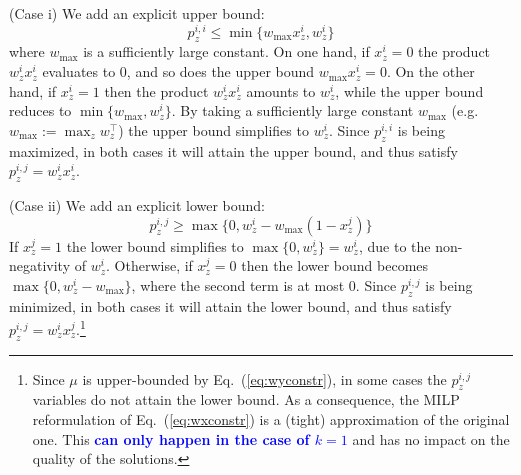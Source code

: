 \documentclass{article}
\renewcommand\[{\begin{equation}}
\renewcommand\]{\end{equation}}
\newcommand{\andrea}[1]{{\bf \textcolor{blue}{{\fbox{Andrea:} #1}}}}
\begin{document}
(Case i) We add an explicit upper bound:
%
$$ p^{i,i}_z \le \min \{ w_\text{max} x^{i}_z, w^{i}_z \} $$
%
where $w_\text{max}$ is a sufficiently large constant.
On one hand, if $x^i_z = 0$ the product $w^i_z x^i_z$ evaluates to $0$, and so does
the upper bound $w_\text{max} x^{i}_z = 0$. On the other hand, if $x^i_z=1$
then the product $w^i_z x^i_z$ amounts to $w^i_z$, while the upper
bound reduces to $\min \{ w_\text{max}, w^{i}_z \}$. By taking a sufficiently
large constant $w_\text{max}$ (e.g. $w_\text{max} := \max_z w^\top_z$) the
upper bound simplifies to $w^i_z$. Since $p^{i,i}_z$ is being maximized, in
both cases it will attain the upper bound, and thus satisfy $p^{i,j}_z = w^i_z x^i_z$.

(Case ii) We add an explicit lower bound:
%
$$ p^{i,j}_z \ge \max \{ 0, w^{i}_z - w_\text{max}(1 - x^{j}_z) \} $$
%
If $x^j_z = 1$ the lower bound simplifies to
$\max \{ 0, w^{i}_z \} = w^{i}_z$, due to the non-negativity of
$w^i_z$. Otherwise, if $x^j_z = 0$ then the lower bound becomes
$\max \{ 0, w^{i}_z - w_\text{max} \}$, where the second term is at
most $0$. Since $p^{i,j}_z$ is being minimized, in both cases it will
attain the lower bound, and thus satisfy
$p^{i,j}_z = w^i_z x^j_z$.\footnote{Since $\mu$ is upper-bounded by
  Eq.~(\ref{eq:wyconstr}), in some cases the $p^{i,j}_z$ variables do
  not attain the lower bound. As a consequence, the MILP reformulation
  of Eq.~(\ref{eq:wxconstr}) is a (tight) approximation of the
  original one. This \andrea{can only happen in the case of $k=1$} and
  has no impact on the quality of the solutions.}
\end{document}
